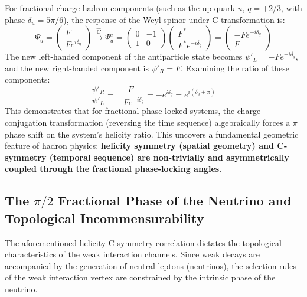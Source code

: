 \documentclass[12pt, a4paper]{article}
\begin{document}
For fractional-charge hadron components (such as the up quark $u$, $q = +2/3$, with phase $\delta_u = 5\pi/6$), the response of the Weyl spinor under C-transformation is:
\begin{equation}
\Psi_u = \begin{pmatrix} F \\ F e^{i\delta_q} \end{pmatrix} \xrightarrow{\hat{C}} \Psi_u^c = \begin{pmatrix} 0 & -1 \\ 1 & 0 \end{pmatrix} \begin{pmatrix} F^* \\ F^* e^{-i\delta_q} \end{pmatrix} = \begin{pmatrix} -F e^{-i\delta_q} \\ F \end{pmatrix} \label{eq:hadron_c_trans}
\end{equation}
The new left-handed component of the antiparticle state becomes $\psi'_L = -F e^{-i\delta_q}$, and the new right-handed component is $\psi'_R = F$. Examining the ratio of these components:
\begin{equation}
\frac{\psi'_R}{\psi'_L} = \frac{F}{-F e^{-i\delta_q}} = -e^{i\delta_q} = e^{i(\delta_q + \pi)} \label{eq:hadron_ratio_shift}
\end{equation}
This demonstrates that for fractional phase-locked systems, the charge conjugation transformation (reversing the time sequence) algebraically forces a $\pi$ phase shift on the system's helicity ratio. This uncovers a fundamental geometric feature of hadron physics: \textbf{helicity symmetry (spatial geometry) and C-symmetry (temporal sequence) are non-trivially and asymmetrically coupled through the fractional phase-locking angles}.

\subsection{The $\pi/2$ Fractional Phase of the Neutrino and Topological Incommensurability}

The aforementioned helicity-C symmetry correlation dictates the topological characteristics of the weak interaction channels. Since weak decays are accompanied by the generation of neutral leptons (neutrinos), the selection rules of the weak interaction vertex are constrained by the intrinsic phase of the neutrino.
\end{document}
